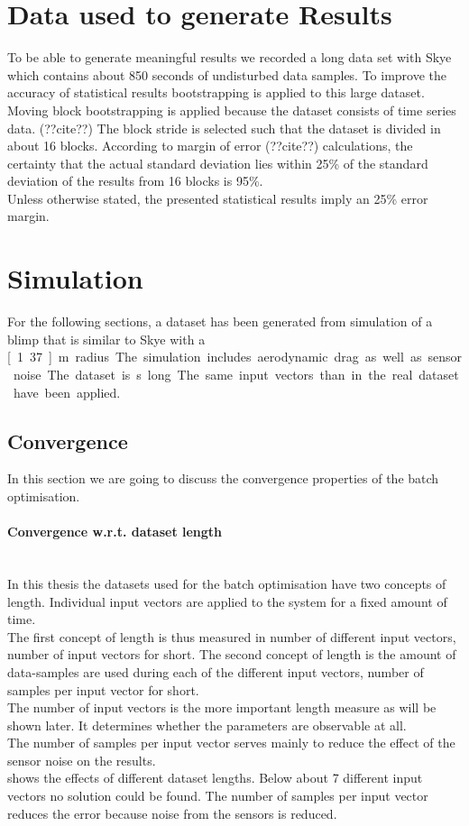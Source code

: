 \section{Data used to generate Results}
\label{sec:bootstrapping_and_statistics}
To be able to generate meaningful results we recorded a long data set with Skye which contains about 850 seconds of undisturbed data samples.
To improve the accuracy of statistical results bootstrapping is applied to this large dataset.
Moving block bootstrapping is applied because the dataset consists of time series data. (??cite??)
The block stride is selected such that the dataset is divided in about 16 blocks.
According to margin of error (??cite??) calculations, the certainty that the actual standard deviation lies within 25\% of the standard deviation of the results from 16 blocks is 95\%. \\
Unless otherwise stated, the presented statistical results imply an 25\% error margin.

\section{Simulation}
For the following sections, a dataset has been generated from simulation of a blimp that is similar to Skye with a \unit[1.37]{m} radius.
The simulation includes aerodynamic drag as well as sensor noise.
The dataset is \unit[850]{s} long.
The same input vectors than in the real dataset have been applied.

\subsection{Convergence}
\label{sec:sim_convergence}
In this section we are going to discuss the convergence properties of the batch optimisation.

\paragraph{Convergence w.r.t. dataset length} ~\\
In this thesis the datasets used for the batch optimisation have two concepts of length.
Individual input vectors are applied to the system for a fixed amount of time. \\
The first concept of length is thus measured in number of different input vectors, number of input vectors for short.
The second concept of length is the amount of data-samples are used during each of the different input vectors, number of samples per input vector for short. \\
The number of input vectors is the more important length measure as will be shown later.
It determines whether the parameters are observable at all. \\
The number of samples per input vector serves mainly to reduce the effect of the sensor noise on the results. \\
 shows the effects of different dataset lengths.
Below about 7 different input vectors no solution could be found. 
The number of samples per input vector reduces the error because noise from the sensors is reduced.

